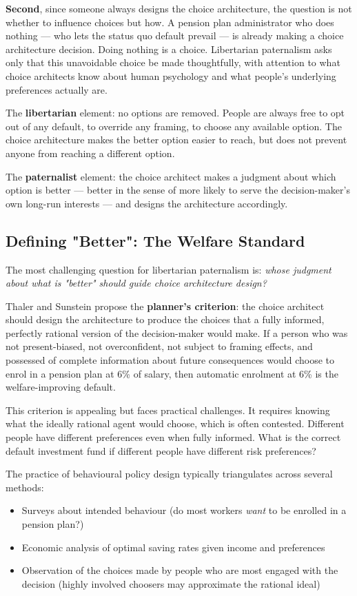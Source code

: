 \documentclass[12pt, letterpaper]{article}
\begin{document}
\textbf{Second}, since someone always designs the choice architecture, the question is not whether to influence choices but how. A pension plan administrator who does nothing --- who lets the status quo default prevail --- is already making a choice architecture decision. Doing nothing is a choice. Libertarian paternalism asks only that this unavoidable choice be made thoughtfully, with attention to what choice architects know about human psychology and what people's underlying preferences actually are.

The \textbf{libertarian} element: no options are removed. People are always free to opt out of any default, to override any framing, to choose any available option. The choice architecture makes the better option easier to reach, but does not prevent anyone from reaching a different option.

The \textbf{paternalist} element: the choice architect makes a judgment about which option is better --- better in the sense of more likely to serve the decision-maker's own long-run interests --- and designs the architecture accordingly.


\subsection{Defining "Better": The Welfare Standard}


The most challenging question for libertarian paternalism is: \textit{whose judgment about what is "better" should guide choice architecture design?}

Thaler and Sunstein propose the \textbf{planner's criterion}: the choice architect should design the architecture to produce the choices that a fully informed, perfectly rational version of the decision-maker would make. If a person who was not present-biased, not overconfident, not subject to framing effects, and possessed of complete information about future consequences would choose to enrol in a pension plan at 6\% of salary, then automatic enrolment at 6\% is the welfare-improving default.

This criterion is appealing but faces practical challenges. It requires knowing what the ideally rational agent would choose, which is often contested. Different people have different preferences even when fully informed. What is the correct default investment fund if different people have different risk preferences?

The practice of behavioural policy design typically triangulates across several methods:
\begin{itemize}
\item Surveys about intended behaviour (do most workers \textit{want} to be enrolled in a pension plan?)
\item Economic analysis of optimal saving rates given income and preferences
\item Observation of the choices made by people who are most engaged with the decision (highly involved choosers may approximate the rational ideal)
\end{itemize}
\end{document}
